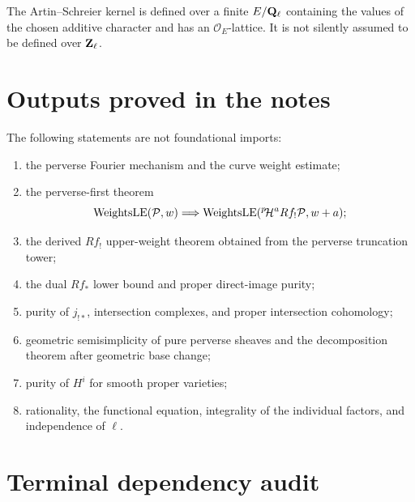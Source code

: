 The Artin--Schreier kernel is defined over a finite \(E/\mathbf Q_\ell\) containing the
values of the chosen additive character and has an
\(\mathcal O_E\)-lattice.  It is not silently assumed to be defined over
\(\mathbf Z_\ell\).

\section{Outputs proved in the notes}

The following statements are not foundational imports:

\begin{enumerate}
\item the perverse Fourier mechanism and the curve weight estimate;
\item the perverse-first theorem
      \[
       \operatorname{WeightsLE}(\mathcal P,w)
       \Longrightarrow
       \operatorname{WeightsLE}({}^{p}\!\mathcal H^aRf_!\mathcal P,w+a);
      \]
\item the derived \(Rf_!\) upper-weight theorem obtained from the perverse
      truncation tower;
\item the dual \(Rf_*\) lower bound and proper direct-image purity;
\item purity of \(j_{!*}\), intersection complexes, and proper intersection
      cohomology;
\item geometric semisimplicity of pure perverse sheaves and the
      decomposition theorem after geometric base change;
\item purity of \(H^i\) for smooth proper varieties;
\item rationality, the functional equation, integrality of the individual
      factors, and independence of \(\ell\).
\end{enumerate}

\section{Terminal dependency audit}


